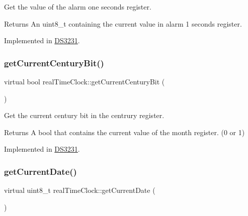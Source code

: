 Get the value of the alarm one seconds register. 

\begin{DoxyReturn}{Returns}
An uint8\+\_\+t containing the current value in alarm 1 seconds register. 
\end{DoxyReturn}


Implemented in \mbox{\hyperlink{class_d_s3231_afd2b16482de8abc10981fdfca0e181a6}{D\+S3231}}.

\mbox{\label{classreal_time_clock_ae0b15649f9135be8f0d9ada65084c28f}} 
\subsubsection{\texorpdfstring{get\+Current\+Century\+Bit()}{getCurrentCenturyBit()}}
{\footnotesize\ttfamily virtual bool real\+Time\+Clock\+::get\+Current\+Century\+Bit (\begin{DoxyParamCaption}{ }\end{DoxyParamCaption})\hspace{0.3cm}{\ttfamily [pure virtual]}}



Get the current century bit in the centrury register. 

\begin{DoxyReturn}{Returns}
A bool that contains the current value of the month register. (0 or 1) 
\end{DoxyReturn}


Implemented in \mbox{\hyperlink{class_d_s3231_a38dfc1567d3419d5aeecd2062d4121c7}{D\+S3231}}.

\mbox{\label{classreal_time_clock_a910bce5ee911c18bd34a4154953ce2ac}} 
\subsubsection{\texorpdfstring{get\+Current\+Date()}{getCurrentDate()}}
{\footnotesize\ttfamily virtual uint8\+\_\+t real\+Time\+Clock\+::get\+Current\+Date (\begin{DoxyParamCaption}{ }\end{DoxyParamCaption})\hspace{0.3cm}{\ttfamily [pure virtual]}}



